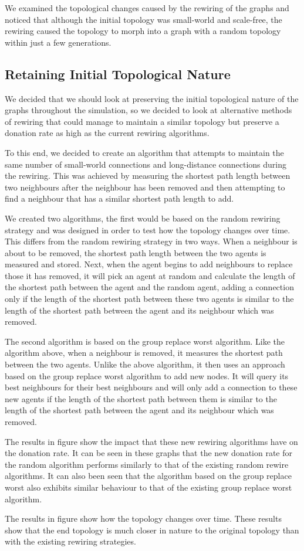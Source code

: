 We examined the topological changes caused by the rewiring of the graphs and noticed that although the initial topology was small-world and scale-free, the rewiring caused the topology to morph into a graph with a random topology within just a few generations.

\subsection{Retaining Initial Topological Nature}

We decided that we should look at preserving the initial topological nature of the graphs throughout the simulation, so we decided to look at alternative methods of rewiring that could manage to maintain a similar topology but preserve a donation rate as high as the current rewiring algorithms.

To this end, we decided to create an algorithm that attempts to maintain the same number of small-world connections and long-distance connections during the rewiring. This was achieved by measuring the shortest path length between two neighbours after the neighbour has been removed and then attempting to find a neighbour that has a similar shortest path length to add.

We created two algorithms, the first would be based on the random rewiring strategy and was designed in order to test how the topology changes over time. This differs from the random rewiring strategy in two ways. When a neighbour is about to be removed, the shortest path length between the two agents is measured and stored. Next, when the agent begins to add neighbours to replace those it has removed, it will pick an agent at random and calculate the length of the shortest path between the agent and the random agent, adding a connection only if the length of the shortest path between these two agents is similar to the length of the shortest path between the agent and its neighbour which was removed.

The second algorithm is based on the group replace worst algorithm. Like the algorithm above, when a neighbour is removed, it measures the shortest path between the two agents. Unlike the above algorithm, it then uses an approach based on the group replace worst algorithm to add new nodes. It will query its best neighbours for their best neighbours and will only add a connection to these new agents if the length of the shortest path between them is similar to the length of the shortest path between the agent and its neighbour which was removed.

The results in figure show the impact that these new rewiring algorithms have on the donation rate. It can be seen in these graphs that the new donation rate for the random algorithm performs similarly to that of the existing random rewire algorithms. It can also been seen that the algorithm based on the group replace worst also exhibits similar behaviour to that of the existing group replace worst algorithm.

The results in figure show how the topology changes over time. These results show that the end topology is much closer in nature to the original topology than with the existing rewiring strategies.